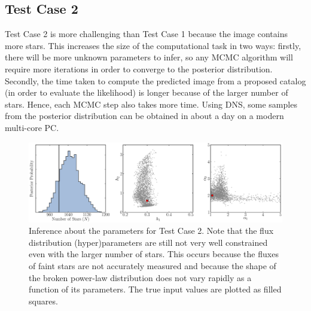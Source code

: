 \documentclass[12pt, preprint]{aastex}
\begin{document}
\subsection{Test Case 2}
Test Case 2 is more challenging than Test Case 1 because the image contains
more stars. This increases the size of the computational task in two ways:
firstly, there will be more unknown parameters to infer, so any MCMC
algorithm will require more iterations in order to converge to the posterior
distribution. Secondly, the time taken
to compute the predicted image from a proposed catalog (in order to evaluate the
likelihood) is longer because of the larger number of stars. Hence, each MCMC
step also takes more time. Using DNS, some
samples from the posterior distribution can be obtained in about a day on a
modern multi-core PC.

\begin{figure}[ht!]
\begin{center}
\includegraphics[width=\textwidth]{Figures/inference2.eps}
\end{center}
\caption{Inference about the parameters for Test Case 2. Note that the
flux distribution (hyper)parameters are still not very well constrained even with
the larger number of
stars. This occurs because the fluxes of faint stars are not accurately measured
and because the shape of the broken power-law distribution does not vary rapidly
as a function of its parameters. The true input values are plotted as filled squares.\label{fig:results2}}
\end{figure}
\end{document}
